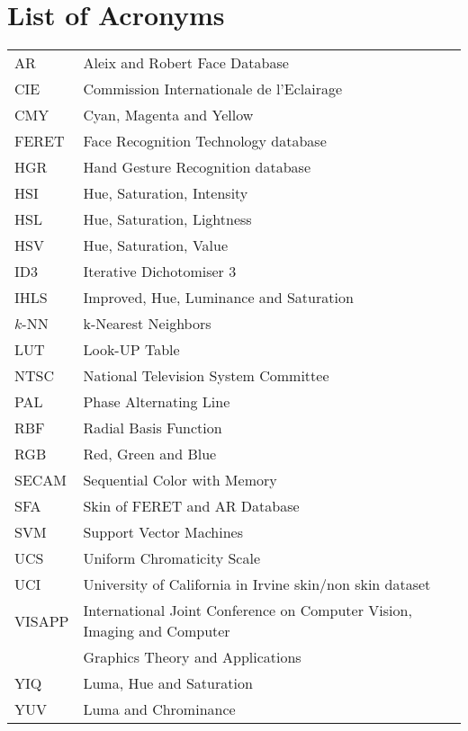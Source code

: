 \documentclass[11pt,twoside,a4paper]{book}
\theoremstyle{plain}
\theoremstyle{definition}
\begin{document}
\chapter{List of Acronyms}
\begin{tabular}{ll}
    AR          & Aleix and Robert Face Database\\
    CIE         & Commission Internationale de l'Eclairage\\
    CMY         & Cyan, Magenta and Yellow\\
    FERET       & Face Recognition Technology database\\
    HGR         & Hand Gesture Recognition database\\
    HSI         & Hue, Saturation, Intensity\\
    HSL         & Hue, Saturation, Lightness\\
    HSV         & Hue, Saturation, Value\\
    ID3         & Iterative Dichotomiser 3\\
    IHLS        & Improved, Hue, Luminance and Saturation\\
    $k$-NN      & k-Nearest Neighbors\\
    LUT         & Look-UP Table\\
    NTSC        & National Television System Committee\\
    PAL         & Phase Alternating Line\\
    RBF         & Radial Basis Function\\
    RGB         & Red, Green and Blue\\
    SECAM       & Sequential Color with Memory\\
    SFA         & Skin of FERET and AR Database\\
    SVM         & Support Vector Machines\\
    UCS         & Uniform Chromaticity Scale\\
    UCI         & University of California in Irvine skin/non skin dataset\\
    VISAPP      & International Joint Conference on Computer Vision, Imaging and Computer\\
                & Graphics Theory and Applications\\
    YIQ         & Luma, Hue and Saturation\\
    YUV         & Luma and Chrominance\\
\end{tabular}
\end{document}
